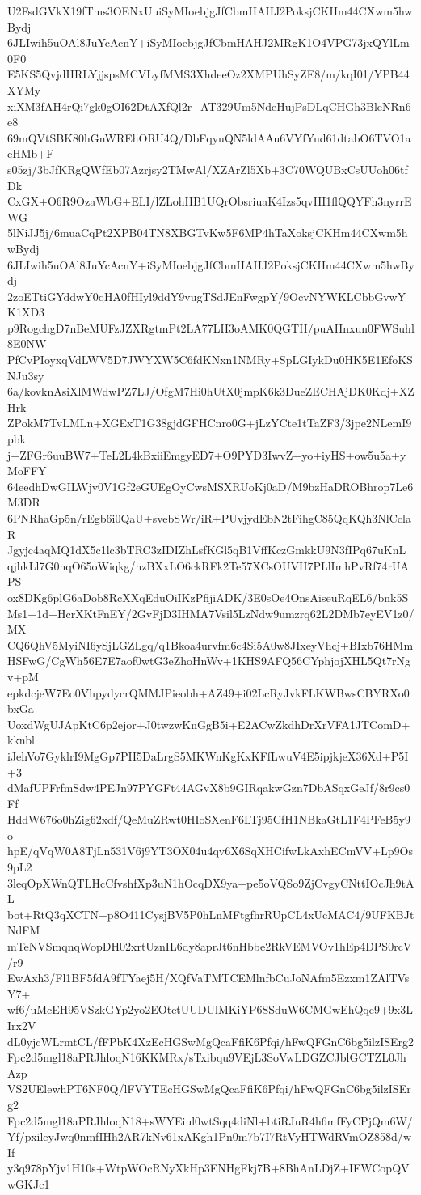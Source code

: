 U2FsdGVkX19fTms3OENxUuiSyMIoebjgJfCbmHAHJ2PoksjCKHm44CXwm5hwBydj
6JLIwih5uOAl8JuYcAcnY+iSyMIoebjgJfCbmHAHJ2MRgK1O4VPG73jxQYlLm0F0
E5KS5QvjdHRLYjjspsMCVLyfMMS3XhdeeOz2XMPUhSyZE8/m/kqI01/YPB44XYMy
xiXM3fAH4rQi7gk0gOI62DtAXfQl2r+AT329Um5NdeHujPsDLqCHGh3BleNRn6e8
69mQVtSBK80hGnWREhORU4Q/DbFqyuQN5ldAAu6VYfYud61dtabO6TVO1acHMb+F
s05zj/3bJfKRgQWfEb07Azrjsy2TMwAl/XZArZl5Xb+3C70WQUBxCsUUoh06tfDk
CxGX+O6R9OzaWbG+ELI/lZLohHB1UQrObsriuaK4Izs5qvHI1flQQYFh3nyrrEWG
5lNiJJ5j/6muaCqPt2XPB04TN8XBGTvKw5F6MP4hTaXoksjCKHm44CXwm5hwBydj
6JLIwih5uOAl8JuYcAcnY+iSyMIoebjgJfCbmHAHJ2PoksjCKHm44CXwm5hwBydj
2zoETtiGYddwY0qHA0fHIyl9ddY9vugTSdJEnFwgpY/9OcvNYWKLCbbGvwYK1XD3
p9RogchgD7nBeMUFzJZXRgtmPt2LA77LH3oAMK0QGTH/puAHnxun0FWSuhl8E0NW
PfCvPIoyxqVdLWV5D7JWYXW5C6fdKNxn1NMRy+SpLGIykDu0HK5E1EfoKSNJu3sy
6a/kovknAsiXlMWdwPZ7LJ/OfgM7Hi0hUtX0jmpK6k3DueZECHAjDK0Kdj+XZHrk
ZPokM7TvLMLn+XGExT1G38gjdGFHCnro0G+jLzYCte1tTaZF3/3jpe2NLemI9pbk
j+ZFGr6uuBW7+TeL2L4kBxiiEmgyED7+O9PYD3IwvZ+yo+iyHS+ow5u5a+yMoFFY
64eedhDwGILWjv0V1Gf2eGUEgOyCwsMSXRUoKj0aD/M9bzHaDROBhrop7Le6M3DR
6PNRhaGp5n/rEgb6i0QaU+svebSWr/iR+PUvjydEbN2tFihgC85QqKQh3NlCclaR
Jgyjc4aqMQ1dX5c1lc3bTRC3zIDIZhLsfKGl5qB1VffKczGmkkU9N3fIPq67uKnL
qjhkLl7G0nqO65oWiqkg/nzBXxLO6ckRFk2Te57XCsOUVH7PLlImhPvRf74rUAPS
ox8DKg6plG6aDob8RcXXqEduOiIKzPfijiADK/3E0sOe4OnsAiseuRqEL6/bnk5S
Ms1+1d+HcrXKtFnEY/2GvFjD3IHMA7Vsil5LzNdw9umzrq62L2DMb7eyEV1z0/MX
CQ6QhV5MyiNI6ySjLGZLgq/q1Bkoa4urvfm6c4Si5A0w8JIxeyVhcj+BIxb76HMm
HSFwG/CgWh56E7E7aof0wtG3eZhoHnWv+1KHS9AFQ56CYphjojXHL5Qt7rNgv+pM
epkdcjeW7Eo0VhpydycrQMMJPieobh+AZ49+i02LcRyJvkFLKWBwsCBYRXo0bxGa
UoxdWgUJApKtC6p2ejor+J0twzwKnGgB5i+E2ACwZkdhDrXrVFA1JTComD+kknbl
iJehVo7GyklrI9MgGp7PH5DaLrgS5MKWnKgKxKFfLwuV4E5ipjkjeX36Xd+P5I+3
dMafUPFrfmSdw4PEJn97PYGFt44AGvX8b9GIRqakwGzn7DbASqxGeJf/8r9cs0Ff
HddW676o0hZig62xdf/QeMuZRwt0HIoSXenF6LTj95CfH1NBkaGtL1F4PFeB5y9o
hpE/qVqW0A8TjLn531V6j9YT3OX04u4qv6X6SqXHCifwLkAxhECmVV+Lp9Os9pL2
3leqOpXWnQTLHcCfvshfXp3uN1hOcqDX9ya+pe5oVQSo9ZjCvgyCNttIOcJh9tAL
bot+RtQ3qXCTN+p8O411CysjBV5P0hLnMFtgfhrRUpCL4xUcMAC4/9UFKBJtNdFM
mTeNVSmqnqWopDH02xrtUznIL6dy8aprJt6nHbbe2RkVEMVOv1hEp4DPS0rcV/r9
EwAxh3/Fl1BF5fdA9fTYaej5H/XQfVaTMTCEMlnfbCuJoNAfm5Ezxm1ZAlTVsY7+
wf6/uMcEH95VSzkGYp2yo2EOtetUUDUlMKiYP6SSduW6CMGwEhQqe9+9x3LIrx2V
dL0yjcWLrmtCL/fFPbK4XzEcHGSwMgQcaFfiK6Pfqi/hFwQFGnC6bg5ilzISErg2
Fpc2d5mgl18aPRJhloqN16KKMRx/sTxibqu9VEjL3SoVwLDGZCJblGCTZL0JhAzp
VS2UElewhPT6NF0Q/lFVYTEcHGSwMgQcaFfiK6Pfqi/hFwQFGnC6bg5ilzISErg2
Fpc2d5mgl18aPRJhloqN18+sWYEiul0wtSqq4diNl+btiRJuR4h6mfFyCPjQm6W/
Yf/pxileyJwq0nmfIHh2AR7kNv61xAKgh1Pn0m7b7I7RtVyHTWdRVmOZ858d/wIf
y3q978pYjv1H10s+WtpWOcRNyXkHp3ENHgFkj7B+8BhAnLDjZ+IFWCopQVwGKJc1
